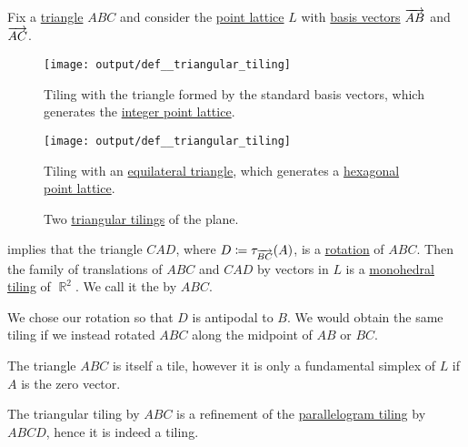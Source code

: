 \begin{definition}\label{def:triangular_tiling}\mimprovised
  Fix a \hyperref[def:triangle]{triangle} \( ABC \) and consider the \hyperref[def:point_lattice]{point lattice} \( L \) with \hyperref[def:point_lattice_basis]{basis vectors} \( \overrightarrow{AB} \) and \( \overrightarrow{AC} \).

  \begin{figure}[!ht]
    \begin{subcaptionblock}[t]{0.45\linewidth}
      \centering
      \texttt{[image: output/def\_\_triangular\_tiling]}
      \caption{Tiling with the triangle formed by the standard basis vectors, which generates the \hyperref[def:integer_point_lattice]{integer point lattice}.}\label{fig:def:triangular_tiling/right}
    \end{subcaptionblock}
    \hfill
    \begin{subcaptionblock}[t]{0.45\linewidth}
      \centering
      \texttt{[image: output/def\_\_triangular\_tiling]}
      \caption{Tiling with an \hyperref[def:triangle/equilateral]{equilateral triangle}, which generates a \hyperref[def:hexagonal_point_lattice]{hexagonal point lattice}.}\label{fig:def:triangular_tiling/equilateral}
    \end{subcaptionblock}
    \caption{Two \hyperref[def:triangular_tiling]{triangular tilings} of the plane.}\label{fig:def:triangular_tiling}
  \end{figure}

   implies that the triangle \( CAD \), where \( D \coloneqq \tau_{\overrightarrow{BC}}(A) \), is a \hyperref[def:rigid_motion/rotation]{rotation} of \( ABC \). Then the family of translations of \( ABC \) and \( CAD \) by vectors in \( L \) is a \hyperref[def:k_hedral_tiling]{monohedral} \hyperref[def:topological_space_tiling]{tiling} of \( \BbbR^2 \). We call it the  by \( ABC \).
\end{definition}
\begin{comments}
  \item We chose our rotation so that \( D \) is antipodal to \( B \). We would obtain the same tiling if we instead rotated \( ABC \) along the midpoint of \( AB \) or \( BC \).

  \item The triangle \( ABC \) is itself a tile, however it is only a fundamental simplex of \( L \) if \( A \) is the zero vector.
\end{comments}
\begin{defproof}
  The triangular tiling by \( ABC \) is a refinement of the \hyperref[def:parallelogram_tiling]{parallelogram tiling} by \( ABCD \), hence it is indeed a tiling.
\end{defproof}

